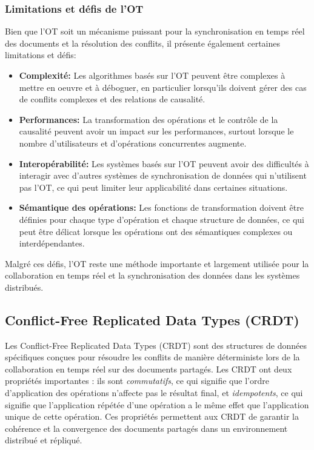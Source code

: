 \subsubsection{Limitations et défis de l'OT}

Bien que l'OT soit un mécanisme puissant pour la synchronisation en temps réel des documents et la résolution des conflits, il présente également certaines limitations et défis:

\begin{itemize}
    \item \textbf{Complexité:} Les algorithmes basés sur l'OT peuvent être complexes à mettre en oeuvre et à déboguer, en particulier lorsqu'ils doivent gérer des cas de conflits complexes et des relations de causalité.
    \item \textbf{Performances:} La transformation des opérations et le contrôle de la causalité peuvent avoir un impact sur les performances, surtout lorsque le nombre d'utilisateurs et d'opérations concurrentes augmente.
    \item \textbf{Interopérabilité:} Les systèmes basés sur l'OT peuvent avoir des difficultés à interagir avec d'autres systèmes de synchronisation de données qui n'utilisent pas l'OT, ce qui peut limiter leur applicabilité dans certaines situations.
    \item \textbf{Sémantique des opérations:} Les fonctions de transformation doivent être définies pour chaque type d'opération et chaque structure de données, ce qui peut être délicat lorsque les opérations ont des sémantiques complexes ou interdépendantes.
\end{itemize}

Malgré ces défis, l'OT reste une méthode importante et largement utilisée pour la collaboration en temps réel et la synchronisation des données dans les systèmes distribués.

\subsection{Conflict-Free Replicated Data Types (CRDT)}

Les Conflict-Free Replicated Data Types (CRDT) sont des structures de données spécifiques conçues pour résoudre les conflits de manière déterministe lors de la collaboration en temps réel sur des documents partagés\cite{crdt}. Les CRDT ont deux propriétés importantes : ils sont \textit{commutatifs}, ce qui signifie que l'ordre d'application des opérations n'affecte pas le résultat final, et \textit{idempotents}, ce qui signifie que l'application répétée d'une opération a le même effet que l'application unique de cette opération. Ces propriétés permettent aux CRDT de garantir la cohérence et la convergence des documents partagés dans un environnement distribué et répliqué.


